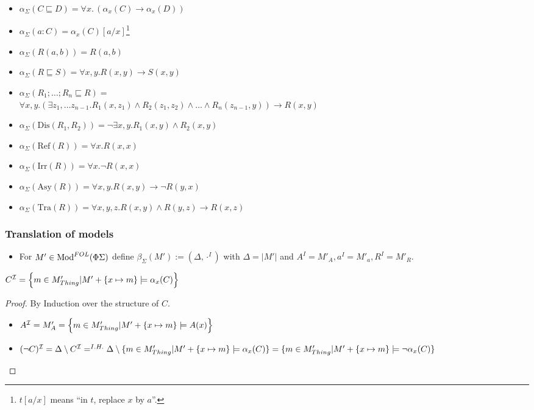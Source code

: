 \documentclass[10pt,fleqn,final]{scrreprt}
\newcommand{\sssclause}[1]{\subsubsection{#1}}
\newenvironment{definitions}[0]{\medskip }{}
\begin{document}
\begin{definitions}
\begin{itemize}
 \item $\alpha_\Sigma (C \sqsubseteq D) = \forall x.\, (\alpha_x(C) \rightarrow \alpha_x(D))$
 \item $\alpha_\Sigma (a:C) = \alpha_x(C)[a/x]$\footnote{$t[a/x]$ means ``in $t$, replace $x$ by $a$''.}
 \item $\alpha_\Sigma (R(a,b)) = R(a,b)$
 \item $\alpha_\Sigma (R \sqsubseteq S) = \forall x, y. R(x,y) \rightarrow S(x,y) $
 \item $\alpha_\Sigma (R_1; \ldots; R_n \sqsubseteq R) =$\\
$ \forall x,y . (\exists z_1,\ldots z_{n-1} . R_1(x,z_1) \wedge R_2(z_1,z_2) \wedge \ldots \wedge R_n(z_{n-1},y)) \rightarrow R(x,y) $
 \item $\alpha_\Sigma (\text{Dis}(R_1,R_2)) = \neg\exists x,y . R_1(x,y)\wedge R_2(x,y)$	
 \item $\alpha_\Sigma (\text{Ref}(R)) = \forall x. R(x,x)$
 \item $\alpha_\Sigma (\text{Irr}(R)) = \forall x. \neg R(x,x)$
 \item $\alpha_\Sigma (\text{Asy}(R)) = \forall x,y . R(x,y) \rightarrow \neg R(y,x)$
 \item $\alpha_\Sigma (\text{Tra}(R)) = \forall x,y,z . R(x,y) \wedge R(y,z) \rightarrow R(x,z)$
\end{itemize}





\sssclause{Translation of models}

\begin{itemize}
	\item For $M' \in \text{Mod}^{FOL}(\Phi \Sigma)$ define $\beta_\Sigma(M') := (\Delta, \cdot^I)$
	with $\Delta = |M'|$ and $A^I = M'_A, a^I = M'_a, R^I = M'_R$.
\end{itemize}

	\begin{proposition}
$C^{\mathcal{I}} = \left\{m \in M'_{{Thing} } \lvert M' + \{x \mapsto m \} \models \alpha_x (C) \right\}$
	\end{proposition}
	
	\begin{proof} By Induction over the structure of $C$.
\begin{itemize}
	\item $A^{\mathcal{I}} = M'_A = \left \{m \in M'_{{Thing} } \vert M' + \{x \mapsto m \} \models A(x)  \right\}$
	\item $(\lnot C)^{\mathcal{I}} = \Delta \setminus C^{\mathcal{I}} =^{I.H.} \Delta \setminus \{m \in M'_{Thing}  \lvert M' + \{x \mapsto m\} \models \alpha_x(C)\} = \{m \in M'_{Thing}  \vert M' + \{x \mapsto m\} \models \lnot \alpha_x(C)\}$
\end{itemize}
	\end{proof}


\end{definitions}
\end{document}
